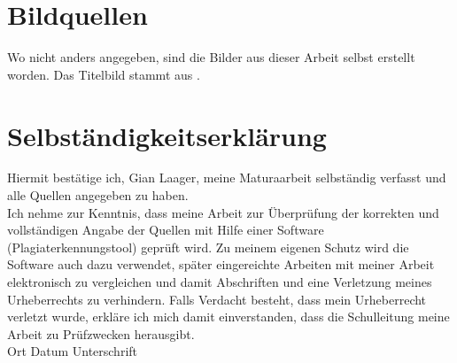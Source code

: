 \documentclass[11pt,DIV=10,final]{scrreprt} %
\begin{document}
\chapter*{Bildquellen}
%
Wo nicht anders angegeben, sind die Bilder aus dieser Arbeit selbst erstellt worden. Das Titelbild stammt aus .
%

% 
% 


%
\chapter*{Selbständigkeitserklärung}
%
Hiermit bestätige ich, Gian Laager, meine Maturaarbeit selbständig verfasst und alle Quellen angegeben zu haben.\\\newline
Ich nehme zur Kenntnis, dass meine Arbeit zur Überprüfung der korrekten und vollständigen Angabe der Quellen mit Hilfe einer Software (Plagiaterkennungstool) geprüft wird. Zu meinem eigenen Schutz wird die Software auch dazu verwendet, später eingereichte Arbeiten mit meiner Arbeit elektronisch zu vergleichen und damit Abschriften und eine Verletzung meines Urheberrechts zu verhindern. Falls Verdacht besteht, dass mein Urheberrecht verletzt wurde, erkläre ich mich damit einverstanden, dass die Schulleitung meine Arbeit zu Prüfzwecken herausgibt.\\\newline
Ort\hspace{4cm} Datum\hspace{4cm}  Unterschrift
%
\end{document}
